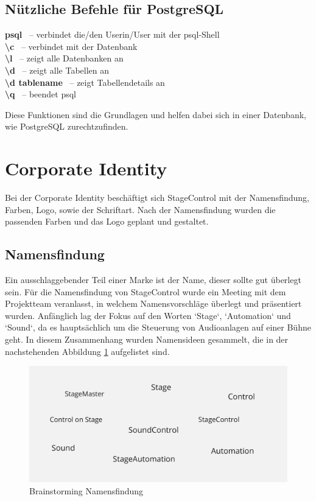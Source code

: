 \subsection{Nützliche Befehle für PostgreSQL}
\textbf{psql} \ – verbindet die/den Userin/User mit der psql-Shell \\
\textbf{\textbackslash{c}} \ – verbindet mit der Datenbank \\
\textbf{\textbackslash{l}} \ – zeigt alle Datenbanken an \\
\textbf{\textbackslash{d}} \ – zeigt alle Tabellen an \\
\textbf{\textbackslash{d} tablename} \ – zeigt Tabellendetails an \\
\textbf{\textbackslash{q}} \ – beendet psql

Diese Funktionen sind die Grundlagen und helfen dabei sich in einer Datenbank, wie PostgreSQL zurechtzufinden.

\section{Corporate Identity}
Bei der Corporate Identity beschäftigt sich StageControl mit der Namensfindung, Farben, Logo, sowie der Schriftart. Nach der Namensfindung wurden die passenden Farben und das Logo geplant und gestaltet.

\subsection{Namensfindung}
Ein ausschlaggebender Teil einer Marke ist der Name, dieser sollte gut überlegt sein. Für die Namensfindung von StageControl wurde ein Meeting mit dem Projektteam veranlasst, in welchem Namensvorschläge überlegt und präsentiert wurden. 
Anfänglich lag der Fokus auf den Worten ‘Stage‘, ‘Automation‘ und ‘Sound‘, da es hauptsächlich um die Steuerung von Audioanlagen auf einer Bühne geht. In diesem Zusammenhang wurden Namensideen gesammelt, die in der nachstehenden Abbildung \ref{fig:Brainstorming_Namensfindung} aufgelistet sind. 

\begin{figure}[H]
	\centering
	\includegraphics[width=0.5\linewidth]{images/Brainstorming_Namensfindung.png}
	\caption[Brainstorming Namensfindung]{Brainstorming Namensfindung}
	\label{fig:Brainstorming_Namensfindung}
\end{figure}

